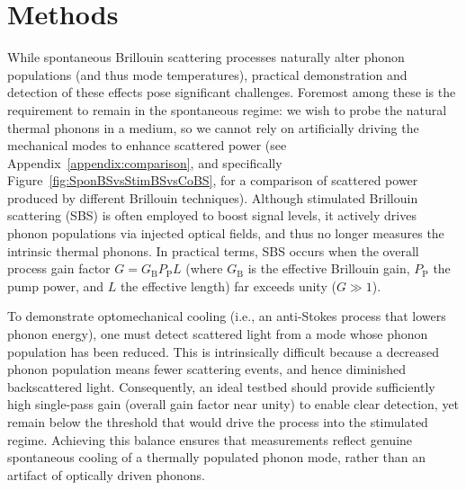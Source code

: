 \section{Methods}
\label{Cooling:sec:Methods}

While spontaneous Brillouin scattering processes naturally alter phonon populations (and thus mode temperatures), practical demonstration and detection of these effects pose significant challenges. Foremost among these is the requirement to remain in the spontaneous regime: we wish to probe the natural thermal phonons in a medium, so we cannot rely on artificially driving the mechanical modes to enhance scattered power (see Appendix~\ref{appendix:comparison}, and specifically Figure~\ref{fig:SponBSvsStimBSvsCoBS}, for a comparison of scattered power produced by different Brillouin techniques). Although stimulated Brillouin scattering (SBS) is often employed to boost signal levels, it actively drives phonon populations via injected optical fields, and thus no longer measures the intrinsic thermal phonons. In practical terms, SBS occurs when the overall process gain factor \(G = G_{\mathrm{B}}P_{\mathrm{P}}L\) (where \(G_{\mathrm{B}}\) is the effective Brillouin gain, \(P_{\mathrm{P}}\) the pump power, and \(L\) the effective length) far exceeds unity (\(G \gg 1\)).

To demonstrate optomechanical cooling (i.e., an anti-Stokes process that lowers phonon energy), one must detect scattered light from a mode whose phonon population has been reduced. This is intrinsically difficult because a decreased phonon population means fewer scattering events, and hence diminished backscattered light. Consequently, an ideal testbed should provide sufficiently high single-pass gain (overall gain factor near unity) to enable clear detection, yet remain below the threshold that would drive the process into the stimulated regime. Achieving this balance ensures that measurements reflect genuine spontaneous cooling of a thermally populated phonon mode, rather than an artifact of optically driven phonons.

